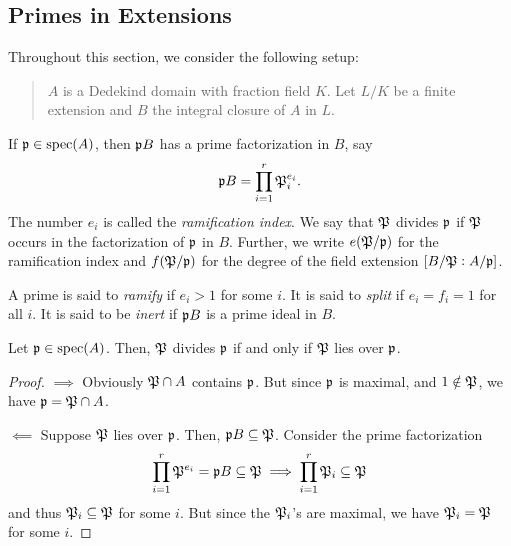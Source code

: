 \subsection{Primes in Extensions}

Throughout this section, we consider the following setup: 
\begin{quotation}
    $A$ is a Dedekind domain with fraction field $K$. Let $L/K$ be a finite extension and $B$ the integral closure of $A$ in $L$.
\end{quotation}

\begin{definition}
    If $\mathfrak p\in\operatorname{spec}(A)$, then $\mathfrak p B$ has a prime factorization in $B$, say 
    \begin{equation*}
        \mathfrak p B = \prod_{i = 1}^r\mathfrak P_i^{e_i}.
    \end{equation*}
    The number $e_i$ is called the \emph{ramification index}. We say that $\mathfrak P$ divides $\mathfrak p$ if $\mathfrak P$ occurs in the factorization of $\mathfrak p$ in $B$. Further, we write $e(\mathfrak P/\mathfrak p)$ for the ramification index and $f(\mathfrak P/\mathfrak p)$ for the degree of the field extension $[B/\mathfrak P: A/\mathfrak p]$.

    A prime is said to \emph{ramify} if $e_i > 1$ for some $i$. It is said to \emph{split} if $e_i = f_i = 1$ for all $i$. It is said to be \emph{inert} if $\mathfrak p B$ is a prime ideal in $B$.
\end{definition}

\begin{proposition}
    Let $\mathfrak p\in\operatorname{spec}(A)$. Then, $\mathfrak P$ divides $\mathfrak p$ if and only if $\mathfrak P$ lies over $\mathfrak p$.
\end{proposition}
\begin{proof}
    $\implies$ Obviously $\mathfrak P\cap A$ contains $\mathfrak p$. But since $\mathfrak p$ is maximal, and $1\notin\mathfrak P$, we have $\mathfrak p = \mathfrak P\cap A$.

    $\impliedby$ Suppose $\mathfrak P$ lies over $\mathfrak p$. Then, $\mathfrak p B\subseteq\mathfrak P$. Consider the prime factorization 
    \begin{equation*}
        \prod_{i = 1}^r \mathfrak P^{e_i} = \mathfrak p B\subseteq\mathfrak P\implies\prod_{i = 1}^r\mathfrak P_i\subseteq\mathfrak P
    \end{equation*}
    and thus $\mathfrak P_i\subseteq\mathfrak P$ for some $i$. But since the $\mathfrak P_i$'s are maximal, we have $\mathfrak P_i = \mathfrak P$ for some $i$.
\end{proof}

